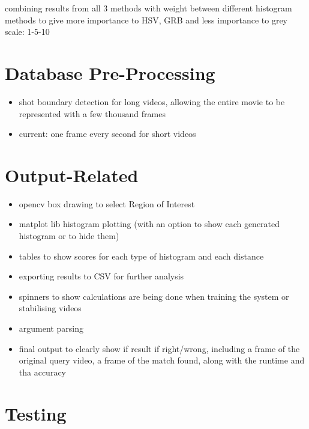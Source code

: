 combining results from all 3 methods with weight between different histogram methods to give more importance to HSV, GRB and less importance to grey scale: 1-5-10

\section{Database Pre-Processing}

\begin{itemize}
    \item shot boundary detection for long videos, allowing the entire movie to be represented with a few thousand frames
    \item current: one frame every second for short videos
\end{itemize}

\section{Output-Related}

\begin{itemize}
    \item opencv box drawing to select Region of Interest
    \item matplot lib histogram plotting (with an option to show each generated histogram or to hide them)
    \item tables to show scores for each type of histogram and each distance
    \item exporting results to CSV for further analysis
    \item spinners to show calculations are being done when training the system or stabilising videos 
    \item argument parsing
    \item final output to clearly show if result if right/wrong, including a frame of the original query video, a frame of the match found, along with the runtime and tha accuracy
\end{itemize}

\section{Testing}

